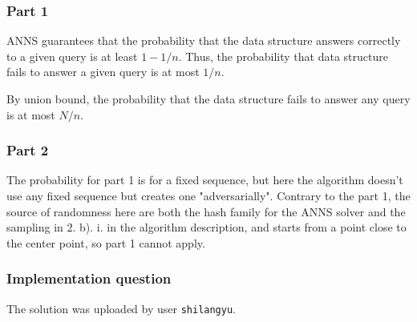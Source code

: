 \documentclass[a4paper, 11pt]{article}
\begin{document}
\subsubsection*{Part 1}

ANNS guarantees that the probability that the data structure answers correctly to a given query is at least $1-1/n$. Thus, the probability that data structure fails to answer a given query is at most $1/n$.

By union bound, the probability that the data structure fails to answer any query is at most $N/n$.

\subsubsection*{Part 2}

The probability for part 1 is for a fixed sequence, but here the algorithm doesn't use any fixed sequence but creates one "adversarially". Contrary to the part 1, the source of randomness here are both the hash family for the ANNS solver and the sampling in 2. b). i. in the algorithm description, and starts from a point close to the center point, so part 1 cannot apply.

\subsubsection*{Implementation question}

The solution was uploaded by user \texttt{shilangyu}.
\end{document}
